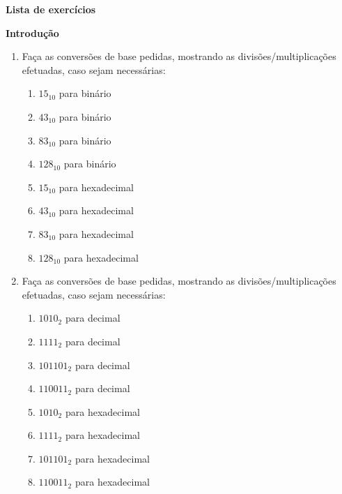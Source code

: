 \documentclass[12pt,onepage,a4paper]{memoir}
\newcommand{\tit}{Lista de exercícios}
\begin{document}
\thispagestyle{1pagina}
\vspace*{3.5cm} %
\begin{center}
    \textbf{\textsf{\large \tit}} %
\end{center}
\begin{center}
    \textbf{Introdução}
\end{center}

\begin{enumerate} %

    \item \label{a1}Faça as conversões de base pedidas, mostrando as divisões/multiplicações efetuadas, caso sejam necessárias:
    \begin{multicols}{2}
        \begin{enumerate}
            \item $15_{10}$ para binário
            \item $43_{10}$ para binário
            \item $83_{10}$ para binário
            \item $128_{10}$ para binário
            \item $15_{10}$ para hexadecimal
            \item $43_{10}$ para hexadecimal
            \item $83_{10}$ para hexadecimal
            \item $128_{10}$ para hexadecimal
        \end{enumerate}
    \end{multicols}

    \item Faça as conversões de base pedidas, mostrando as divisões/multiplicações efetuadas, caso sejam necessárias:
    \begin{multicols}{2}
        \begin{enumerate}
            \item $1010_{2}$ para decimal
            \item $1111_{2}$ para decimal
            \item $101101_{2}$ para decimal
            \item $110011_{2}$ para decimal
            \item $1010_{2}$ para hexadecimal
            \item $1111_{2}$ para hexadecimal
            \item $101101_{2}$ para hexadecimal
            \item $110011_{2}$ para hexadecimal
        \end{enumerate}
    \end{multicols}    


\end{enumerate}
\end{document}
